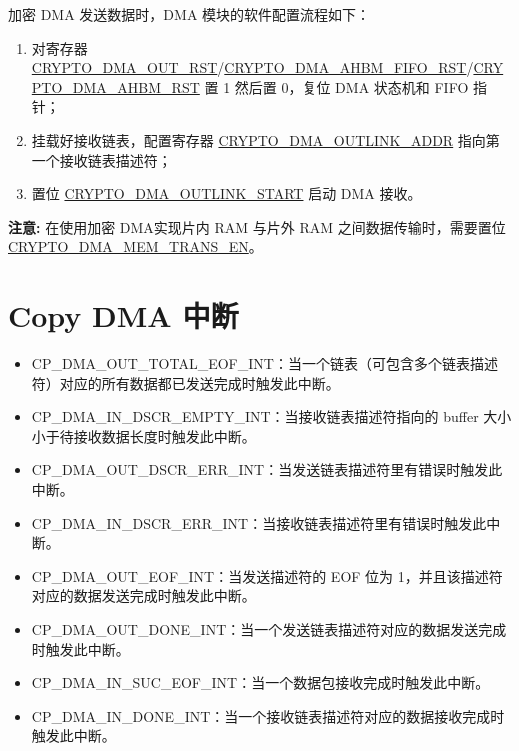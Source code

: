 \documentclass[main\_\_CN.tex]{subfiles}
\begin{document}
加密 DMA 发送数据时，DMA 模块的软件配置流程如下：
\begin{enumerate}
    \item 对寄存器 \hyperref[fielddesc:CRYPTODMAOUTRST]{CRYPTO\_DMA\_OUT\_RST}/\hyperref[fielddesc:CRYPTODMAAHBMFIFORST]{CRYPTO\_DMA\_AHBM\_FIFO\_RST}/\hyperref[fielddesc:CRYPTODMAAHBMRST]{CRYPTO\_DMA\_AHBM\_RST} 置 1 然后置 0，复位 DMA 状态机和 FIFO 指针；
    \item 挂载好接收链表，配置寄存器 \hyperref[fielddesc:CRYPTODMAOUTLINKADDR]{CRYPTO\_DMA\_OUTLINK\_ADDR} 指向第一个接收链表描述符；
    \item 置位 \hyperref[fielddesc:CRYPTODMAOUTLINKSTART]{CRYPTO\_DMA\_OUTLINK\_START} 启动 DMA 接收。
\end{enumerate}

{\bfseries 注意: }在使用加密 DMA实现片内 RAM 与片外 RAM 之间数据传输时，需要置位 \hyperref[fielddesc:CRYPTODMAMEMTRANSEN]{CRYPTO\_DMA\_MEM\_TRANS\_EN}。

\section{Copy DMA 中断}
\begin{itemize}
\item \label{int:CPDMAOUTTOTALEOFINT}CP\_DMA\_OUT\_TOTAL\_EOF\_INT：当一个链表（可包含多个链表描述符）对应的所有数据都已发送完成时触发此中断。
\item \label{int:CPDMAINDSCREMPTYINT}CP\_DMA\_IN\_DSCR\_EMPTY\_INT：当接收链表描述符指向的 buffer 大小小于待接收数据长度时触发此中断。
\item \label{int:CPDMAOUTDSCRERRINT}CP\_DMA\_OUT\_DSCR\_ERR\_INT：当发送链表描述符里有错误时触发此中断。
\item \label{int:CPDMAINDSCRERRINT}CP\_DMA\_IN\_DSCR\_ERR\_INT：当接收链表描述符里有错误时触发此中断。
\item \label{int:CPDMAOUTEOFINT}CP\_DMA\_OUT\_EOF\_INT：当发送描述符的 EOF 位为 1，并且该描述符对应的数据发送完成时触发此中断。
\item \label{int:CPDMAOUTDONEINT}CP\_DMA\_OUT\_DONE\_INT：当一个发送链表描述符对应的数据发送完成时触发此中断。
\item \label{int:CPDMAINSUCEOFINT}CP\_DMA\_IN\_SUC\_EOF\_INT：当一个数据包接收完成时触发此中断。
\item \label{int:CPDMAINDONEINT}CP\_DMA\_IN\_DONE\_INT：当一个接收链表描述符对应的数据接收完成时触发此中断。
\end{itemize}
\end{document}
